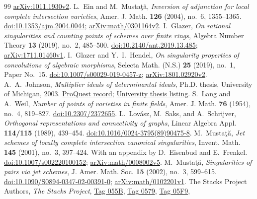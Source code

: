 \documentclass[11pt]{article}
\numberwithin{equation}{section}
\theoremstyle{remark}
\begin{document}
\begin{thebibliography}{99}
\href{https://arxiv.org/abs/1011.1930v2}{arXiv:1011.1930v2}.
L.~Ein and M.~Musta\c{t}\u{a},
\emph{Inversion of adjunction for local complete intersection varieties},
Amer. J. Math. \textbf{126} (2004), no.~6, 1355--1365.
\href{https://doi.org/10.1353/ajm.2004.0044}{doi:10.1353/ajm.2004.0044};
\href{https://arxiv.org/abs/math/0301164v2}{arXiv:math/0301164v2}.
I.~Glazer, \emph{On rational singularities and counting points of
schemes over finite rings}, Algebra Number Theory \textbf{13} (2019),
no.~2, 485--500.
\href{https://doi.org/10.2140/ant.2019.13.485}{doi:10.2140/ant.2019.13.485};
\href{https://arxiv.org/abs/1711.01460v1}{arXiv:1711.01460v1}.
I.~Glazer and Y.~I.~Hendel,
\emph{On singularity properties of convolutions of algebraic morphisms},
Selecta Math. (N.S.) \textbf{25} (2019), no.~1, Paper No.~15.
\href{https://doi.org/10.1007/s00029-019-0457-z}{doi:10.1007/s00029-019-0457-z};
\href{https://arxiv.org/abs/1801.02920v2}{arXiv:1801.02920v2}.
A.~A.~Johnson, \emph{Multiplier ideals of determinantal ideals},
Ph.D. thesis, University of Michigan, 2003.
\href{https://www.proquest.com/docview/287933180}{ProQuest record};
\href{https://sites.lsa.umich.edu/kesmith/graduate-students/}{University thesis listing}.
S.~Lang and A.~Weil,
\emph{Number of points of varieties in finite fields},
Amer. J. Math. \textbf{76} (1954), no.~4, 819--827.
\href{https://doi.org/10.2307/2372655}{doi:10.2307/2372655}.
L.~Lov\'asz, M.~Saks, and A.~Schrijver,
\emph{Orthogonal representations and connectivity of graphs},
Linear Algebra Appl. \textbf{114/115} (1989), 439--454.
\href{https://doi.org/10.1016/0024-3795(89)90475-8}{doi:10.1016/0024-3795(89)90475-8}.
M.~Musta\c{t}\u{a},
\emph{Jet schemes of locally complete intersection canonical singularities},
Invent. Math. \textbf{145} (2001), no.~3, 397--424.
With an appendix by D.~Eisenbud and E.~Frenkel.
\href{https://doi.org/10.1007/s002220100152}{doi:10.1007/s002220100152};
\href{https://arxiv.org/abs/math/0008002v5}{arXiv:math/0008002v5}.
M.~Musta\c{t}\u{a},
\emph{Singularities of pairs via jet schemes},
J. Amer. Math. Soc. \textbf{15} (2002), no.~3, 599--615.
\href{https://doi.org/10.1090/S0894-0347-02-00391-0}{doi:10.1090/S0894-0347-02-00391-0};
\href{https://arxiv.org/abs/math/0102201v1}{arXiv:math/0102201v1}.
The Stacks Project Authors, \emph{The Stacks Project},
\href{https://stacks.math.columbia.edu/tag/055B}{Tag 055B},
\href{https://stacks.math.columbia.edu/tag/0579}{Tag 0579},
\href{https://stacks.math.columbia.edu/tag/05F9}{Tag 05F9},

\end{thebibliography}
\end{document}
